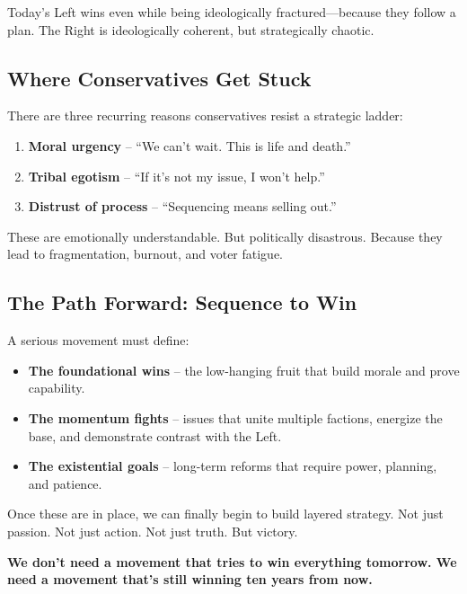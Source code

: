 Today’s Left wins even while being ideologically fractured—because they follow a plan. The Right is ideologically coherent, but strategically chaotic.

\subsection*{Where Conservatives Get Stuck}

There are three recurring reasons conservatives resist a strategic ladder:
\begin{enumerate}
    \item \textbf{Moral urgency} – “We can’t wait. This is life and death.”  
    \item \textbf{Tribal egotism} – “If it’s not my issue, I won’t help.”
    \item \textbf{Distrust of process} – “Sequencing means selling out.”
\end{enumerate}

These are emotionally understandable. But politically disastrous. Because they lead to fragmentation, burnout, and voter fatigue.

\subsection*{The Path Forward: Sequence to Win}

A serious movement must define:
\begin{itemize}
    \item \textbf{The foundational wins} – the low-hanging fruit that build morale and prove capability.
    \item \textbf{The momentum fights} – issues that unite multiple factions, energize the base, and demonstrate contrast with the Left.
    \item \textbf{The existential goals} – long-term reforms that require power, planning, and patience.
\end{itemize}

Once these are in place, we can finally begin to build layered strategy. Not just passion. Not just action. Not just truth. But victory.

\textbf{We don’t need a movement that tries to win everything tomorrow. We need a movement that’s still winning ten years from now.}

















